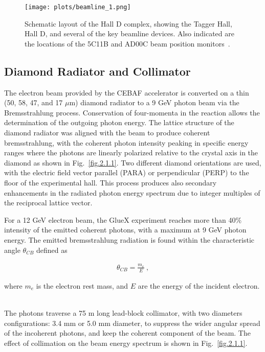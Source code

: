{\begin{figure}[H]
    \centering
        \texttt{[image: plots/beamline\_1.png]}
        \caption{Schematic layout of the Hall D complex, showing the Tagger Hall, Hall D, and several of the key beamline devices. Also indicated are the locations of the 5C11B and AD00C beam position monitors~\cite{Charles16}.}
        \label{fig.2.1}
\end{figure}

\subsection{Diamond Radiator and Collimator}
\label{p.2.1.1}

The electron beam provided by the CEBAF accelerator is converted on a thin (50, 58, 47, and 17 $\mu$m) diamond radiator to a 9 GeV photon beam via the Bremsstrahlung process. Conservation of four-momenta in the reaction allows the determination of the outgoing photon energy. The lattice structure of the diamond radiator was aligned with the beam to produce coherent bremsstrahlung, with the coherent photon intensity peaking in specific energy ranges where the photons are linearly polarized relative to the crystal axis in the diamond as shown in Fig.~\ref{fig.2.1.1}. Two different diamond orientations are used, with the electric field vector parallel (PARA) or perpendicular (PERP) to the floor of the experimental hall. This process produces also secondary enhancements in the radiated photon energy spectrum due to integer multiples of the reciprocal lattice vector.
~\par For a 12 GeV electron beam, the GlueX experiment reaches more than 40$\%$ intensity of the emitted coherent photons, with a maximum at 9 GeV photon energy. The emitted bremsstrahlung radiation is found within the characteristic angle $\theta_{CB}$ defined as

\begin{equation}
    \label{eq.2.1.1}
    \begin{aligned}
        \theta_{CB} = \frac{m_{e}}{E}~,
    \end{aligned}
\end{equation}

\noindent where $m_{e}$ is the electron rest mass, and $E$ are the energy of the incident electron.
~\par The photons traverse a 75 m long lead-block collimator, with two diameters configurations: 3.4 mm or 5.0 mm diameter, to suppress the wider angular spread of the incoherent photons, and keep the coherent component of the beam. The effect of collimation on the beam energy spectrum is shown in Fig.~\ref{fig.2.1.1}.

}
